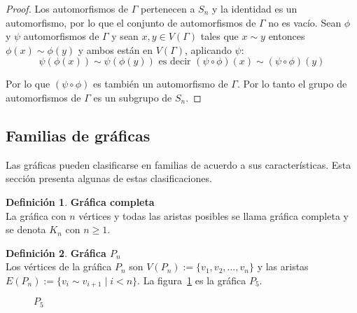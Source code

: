 \documentclass[11pt]{book}
\theoremstyle{definition}
\newtheorem{definition}{Definición}
\begin{document}
\begin{proof} Los automorfismos de $\Gamma$ pertenecen a $S_n$
  y la identidad es un automorfismo, por lo que el conjunto de
  automorfismos de $\Gamma$ no es vacío. Sean $\phi$ y $\psi$
  automorfismos de $\Gamma$ y sean $x,y\in V(\Gamma)$ tales que $x\sim
  y$ entonces $\phi(x)\sim \phi(y)$ y ambos están en $V(\Gamma)$,
  aplicando $\psi$:
\begin{equation*}
  \psi(\phi(x))\sim \psi(\phi(y))
  \mbox{ es decir } 
  (\psi \circ \phi) (x)\sim (\psi \circ \phi)(y)
\end{equation*}

Por lo que $(\psi \circ \phi)$ es también un automorfismo de
$\Gamma$. Por lo tanto el grupo de automorfismos de $\Gamma$ es un
subgrupo de $S_n$.
\end{proof}

\subsection{Familias de gráficas}

Las gráficas pueden clasificarse en familias de acuerdo a sus
características. Esta sección presenta algunas de estas
clasificaciones.

\begin{definition}\textbf{Gráfica completa}\\
  La gráfica con $n$ vértices y todas las aristas posibles se llama
  gráfica completa y se denota $K_n$ con $n\geq 1$.
\end{definition}

\begin{definition}\textbf{Gráfica $P_n$}\\
  Los vértices de la gráfica $P_n$ son $V(P_n):=\{v_1,v_2,...,v_n\}$ y
  las aristas $E(P_n):=\{v_i \sim v_{i+1} \mid i<n\}$. La
  figura~\ref{P5} es la gráfica $P_5$.
\end{definition}


\begin{figure}
  \centering
  \caption{$P_5$} \label{P5}
\end{figure}
\end{document}
